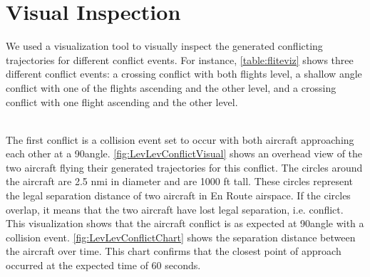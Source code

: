 \section{Visual Inspection}
We used a visualization tool to visually inspect the generated conflicting trajectories for different conflict events. For instance, \ref{table:fliteviz} shows three different conflict events: a crossing conflict with both flights level, a shallow angle conflict with one of the flights ascending and the other level, and a crossing conflict with one flight ascending and the other level.

\begin{table}[H]
\caption{Conflict Properties for each Specified Conflict Event in FliteViz4D}
\label{table:fliteviz}
\centering
{}
\end{table}
~\\

The first conflict is a collision event set to occur with both aircraft approaching each other at a 90\textdegree angle. \ref{fig:LevLevConflictVisual} shows an overhead view of the two aircraft flying their generated trajectories for this conflict. The circles around the aircraft are 2.5 nmi in diameter and are 1000 ft tall. These circles represent the legal separation distance of two aircraft in En Route airspace. If the circles overlap, it means that the two aircraft have lost legal separation, i.e. conflict. This visualization shows that the aircraft conflict is as expected at 90\textdegree angle with a collision event. \ref{fig:LevLevConflictChart} shows the separation distance between the aircraft over time. This chart confirms that the closest point of approach occurred at the expected time of 60 seconds.

\begin{figure}[H]
\centering
{}
\end{figure}

